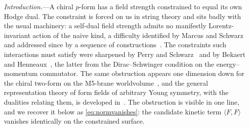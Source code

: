 \documentclass[
  aps,prd,
  reprint,
  letterpaper,
  amsmath,amssymb,
  nofootinbib,
  superscriptaddress
]{revtex4-2}
\theoremstyle{plain}
\begin{document}
\begin{center}
\end{center}
\vspace{4pt}

\emph{Introduction.}---A chiral $p$-form has a field strength constrained to
equal its own Hodge dual. The constraint is forced on us in string theory and
sits badly with the usual machinery: a self-dual field strength admits no
manifestly Lorentz-invariant action of the naive kind, a difficulty identified
by Marcus and Schwarz~\cite{Marcus:1982yu} and addressed since by a sequence of
constructions~\cite{Henneaux:1988gg,Schwarz:1993vs,Pasti:1995tn,Pasti:1997gx,Sen:2019qit,Mkrtchyan:2019wnk,Sen:2015nph,Avetisyan:2021heg,Avetisyan:2022zza,Evnin:2022kqf,Bandos:2020jsw}.
The constraints such interactions must satisfy were sharpened by Perry and
Schwarz~\cite{Perry:1996mk} and by Bekaert and Henneaux~\cite{Bekaert:1998yp},
the latter from the Dirac--Schwinger condition on the energy--momentum
commutator. The same obstruction appears one dimension down for the chiral
two-form on the M5-brane worldvolume~\cite{Witten:1996hc,Deger:2024jyq}, and the
general representation theory of form fields of arbitrary Young symmetry, with
the dualities relating them, is developed in~\cite{Bekaert:2002dt}. The obstruction is visible in one line, and we
recover it below as \eqref{eq:normvanishes}: the candidate kinetic term
$\langle F,F\rangle$ vanishes identically on the constrained surface.
\end{document}
